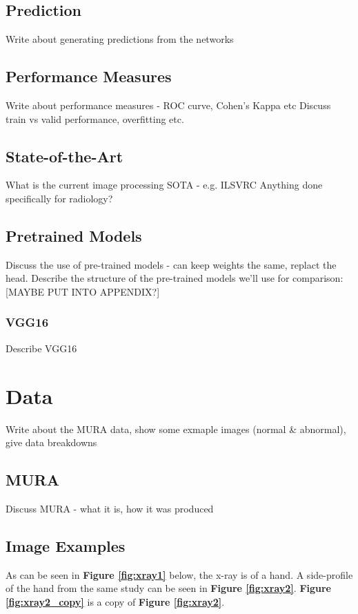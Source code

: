 \documentclass[11pt]{article} %
\theoremstyle{plain}
\theoremstyle{definition}
\begin{document}
\subsection{Prediction}
Write about generating predictions from the networks

\subsection{Performance Measures}
Write about performance measures - ROC curve, Cohen's Kappa etc
Discuss train vs valid performance, overfitting etc.

\subsection{State-of-the-Art}
What is the current image processing SOTA - e.g. ILSVRC
Anything done specifically for radiology?

\subsection{Pretrained Models}
Discuss the use of pre-trained models - can keep weights the same, replact the head.
Describe the structure of the pre-trained models we'll use for comparison:
[MAYBE PUT INTO APPENDIX?] 
\subsubsection{VGG16}
Describe VGG16 \\



\newpage
\section{Data}
Write about the MURA data, show some exmaple images (normal \& abnormal), give data breakdowns 

\subsection{MURA}
Discuss MURA - what it is, how it was produced

\subsection{Image Examples}
As can be seen in \textbf{Figure \ref{fig:xray1}} below, the x-ray is of a hand. A side-profile of the hand from the same study can be seen in \textbf{Figure \ref{fig:xray2}}. \textbf{Figure \ref{fig:xray2_copy}} is a copy of \textbf{Figure \ref{fig:xray2}}.
\end{document}
